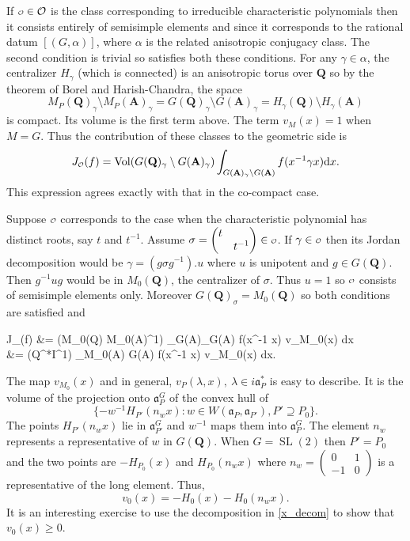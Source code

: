 \documentclass[11pt]{amsart}
\def\A{\mathbf A}
\def\I{\mathbf I}
\def\Q{\mathbf Q}
\def\O{\mathcal O}
\def\o{\scalebox{0.8}{$\scriptstyle\mathcal{O}$}}
\def\aaa{\mathfrak a}
\def\cb#1{{\color{blue}#1}}
\def\d{\text d}
\def\bs{\setminus} 			%
\def\sl{\operatorname{SL}}
\def\vol{\operatorname{Vol}}
\theoremstyle{remark}
\begin{document}
\cb{
If $\o \in \O$ is the class corresponding to irreducible characteristic polynomials then it consists entirely of semisimple elements and since it corresponds to the rational datum $[(G, \alpha)]$, where $\alpha$ is the related anisotropic conjugacy class. The second condition is trivial so satisfies both these conditions. For any $\gamma \in \alpha$, the centralizer $H_\gamma$ (which is connected) is an anisotropic torus over $\Q$ so by the theorem of Borel and Harish-Chandra, the space
\[ M_P(\Q)_\gamma\bs M_P(\A)_\gamma = G(\Q)_\gamma \bs G(\A)_\gamma = H_\gamma(\Q)\bs H_\gamma(\A) \]
is compact. Its volume is the first term above. The term $v_M(x) = 1$ when $M=G$. Thus the contribution of these classes to the geometric side is
\[ J_{\o}(f) = \vol(G(\Q)_\gamma \bs G(\A)_\gamma) \int_{G(\A)_\gamma \bs G(\A)} f(x^{-1} \gamma x) \d x. \]
This expression agrees exactly with that in the co-compact case. }

\cb{
Suppose $\o$ corresponds to the case when the characteristic polynomial has distinct roots, say $t$ and $t^{-1}$. Assume $\sigma = \begin{pmatrix} t & \\ & t^{-1} \end{pmatrix} \in \o$. If $\gamma \in \o$ then its Jordan decomposition would be $\gamma = (g\sigma g^{-1}) . u$ where $u$ is unipotent and $g \in G(\Q)$. Then $g^{-1} u g$ would be in $M_0(\Q)$, the centralizer of $\sigma$. Thus $u=1$ so $\o$ consists of semisimple elements only. Moreover $G(\Q)_\sigma = M_0(\Q)$ so both conditions are satisfied and 
\begin{flalign*}
	J_{\o}(f) &=  \vol(M_0(\Q) \bs M_0(\A)^1) \int_{G(\A)_\gamma \bs G(\A)} f(x^{-1} \gamma x) v_{M_0}(x) \d x \\
			&= \vol(\Q^*\bs \I^1) \int_{M_0(\A) \bs G(\A)}  f(x^{-1} \gamma x) v_{M_0}(x) \d x.
\end{flalign*}
}

The map $v_{M_0}(x)$ and in general, $v_P(\lambda, x), \ \lambda \in i\aaa_P^*$ is easy to describe. It is the volume of the projection onto $\aaa_P^G$ of the convex hull of 
\[ \{ -w^{-1} H_{P'}(n_w x) : w \in W(\aaa_P, \aaa_{P'}), P' \supseteq P_0 \}. \]
The points $H_{P'}(n_w x)$ lie in $\aaa_{P'}^G$ and $w^{-1}$ maps them into $\aaa_P^G$. The element $n_w$ represents a representative of $w$ in $G(\Q)$. \cb{When $G=\sl(2)$ then $P' = P_0$ and the two points are $-H_{P_0}(x)$ and $H_{P_0}(n_w x)$ where $n_w = \begin{pmatrix} 0 & 1 \\ -1 & 0 \end{pmatrix}$ is a representative of the long element. Thus,
\[ v_0(x) = - H_0(x) - H_0(n_w x). \]
It is an interesting exercise to use the decomposition in \cref{x_decom} to show that $v_0(x) \geq 0$. }
\end{document}
